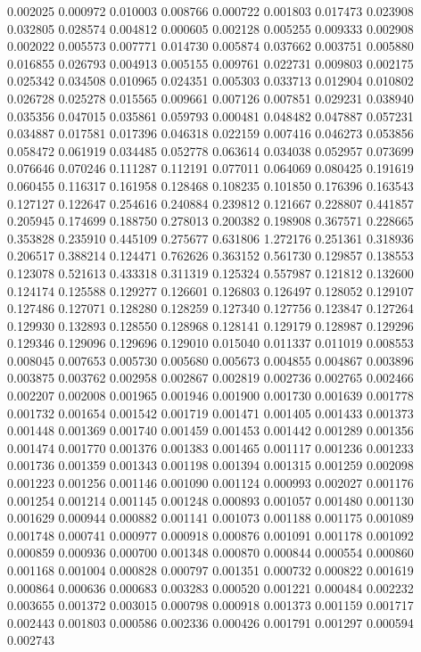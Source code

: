 0.002025
0.000972
0.010003
0.008766
0.000722
0.001803
0.017473
0.023908
0.032805
0.028574
0.004812
0.000605
0.002128
0.005255
0.009333
0.002908
0.002022
0.005573
0.007771
0.014730
0.005874
0.037662
0.003751
0.005880
0.016855
0.026793
0.004913
0.005155
0.009761
0.022731
0.009803
0.002175
0.025342
0.034508
0.010965
0.024351
0.005303
0.033713
0.012904
0.010802
0.026728
0.025278
0.015565
0.009661
0.007126
0.007851
0.029231
0.038940
0.035356
0.047015
0.035861
0.059793
0.000481
0.048482
0.047887
0.057231
0.034887
0.017581
0.017396
0.046318
0.022159
0.007416
0.046273
0.053856
0.058472
0.061919
0.034485
0.052778
0.063614
0.034038
0.052957
0.073699
0.076646
0.070246
0.111287
0.112191
0.077011
0.064069
0.080425
0.191619
0.060455
0.116317
0.161958
0.128468
0.108235
0.101850
0.176396
0.163543
0.127127
0.122647
0.254616
0.240884
0.239812
0.121667
0.228807
0.441857
0.205945
0.174699
0.188750
0.278013
0.200382
0.198908
0.367571
0.228665
0.353828
0.235910
0.445109
0.275677
0.631806
1.272176
0.251361
0.318936
0.206517
0.388214
0.124471
0.762626
0.363152
0.561730
0.129857
0.138553
0.123078
0.521613
0.433318
0.311319
0.125324
0.557987
0.121812
0.132600
0.124174
0.125588
0.129277
0.126601
0.126803
0.126497
0.128052
0.129107
0.127486
0.127071
0.128280
0.128259
0.127340
0.127756
0.123847
0.127264
0.129930
0.132893
0.128550
0.128968
0.128141
0.129179
0.128987
0.129296
0.129346
0.129096
0.129696
0.129010
0.015040
0.011337
0.011019
0.008553
0.008045
0.007653
0.005730
0.005680
0.005673
0.004855
0.004867
0.003896
0.003875
0.003762
0.002958
0.002867
0.002819
0.002736
0.002765
0.002466
0.002207
0.002008
0.001965
0.001946
0.001900
0.001730
0.001639
0.001778
0.001732
0.001654
0.001542
0.001719
0.001471
0.001405
0.001433
0.001373
0.001448
0.001369
0.001740
0.001459
0.001453
0.001442
0.001289
0.001356
0.001474
0.001770
0.001376
0.001383
0.001465
0.001117
0.001236
0.001233
0.001736
0.001359
0.001343
0.001198
0.001394
0.001315
0.001259
0.002098
0.001223
0.001256
0.001146
0.001090
0.001124
0.000993
0.002027
0.001176
0.001254
0.001214
0.001145
0.001248
0.000893
0.001057
0.001480
0.001130
0.001629
0.000944
0.000882
0.001141
0.001073
0.001188
0.001175
0.001089
0.001748
0.000741
0.000977
0.000918
0.000876
0.001091
0.001178
0.001092
0.000859
0.000936
0.000700
0.001348
0.000870
0.000844
0.000554
0.000860
0.001168
0.001004
0.000828
0.000797
0.001351
0.000732
0.000822
0.001619
0.000864
0.000636
0.000683
0.003283
0.000520
0.001221
0.000484
0.002232
0.003655
0.001372
0.003015
0.000798
0.000918
0.001373
0.001159
0.001717
0.002443
0.001803
0.000586
0.002336
0.000426
0.001791
0.001297
0.000594
0.002743
